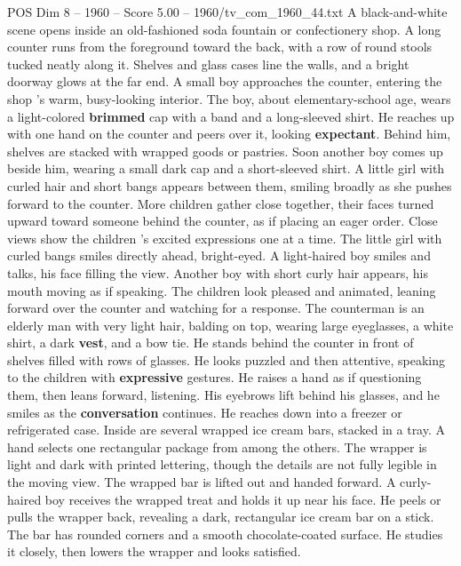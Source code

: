 \begin{textsample}{POS Dim 8 – 1960 – Score 5.00 – 1960/tv\_com\_1960\_44.txt}  \label{ex:f8_pos_087}
A black-and-white scene opens inside an old-fashioned soda fountain or confectionery shop.
A long counter runs from the foreground toward the back, with a row of round stools tucked neatly along it.
Shelves and glass cases line the walls, and a bright doorway glows at the far end.
A small boy approaches the counter, entering the shop ’s warm, busy-looking interior.
The boy, about elementary-school age, wears a light-colored \textbf{brimmed} cap with a band and a long-sleeved shirt.
He reaches up with one hand on the counter and peers over it, looking \textbf{expectant}.
Behind him, shelves are stacked with wrapped goods or pastries.
Soon another boy comes up beside him, wearing a small dark cap and a short-sleeved shirt.
A little girl with curled hair and short bangs appears between them, smiling broadly as she pushes forward to the counter.
More children gather close together, their faces turned upward toward someone behind the counter, as if placing an eager order.
Close views show the children ’s excited expressions one at a time.
The little girl with curled bangs smiles directly ahead, bright-eyed.
A light-haired boy smiles and talks, his face filling the view.
Another boy with short curly hair appears, his mouth moving as if speaking.
The children look pleased and animated, leaning forward over the counter and watching for a response.
The counterman is an elderly man with very light hair, balding on top, wearing large eyeglasses, a white shirt, a dark \textbf{vest}, and a bow tie.
He stands behind the counter in front of shelves filled with rows of glasses.
He looks puzzled and then attentive, speaking to the children with \textbf{expressive} gestures.
He raises a hand as if questioning them, then leans forward, listening.
His eyebrows lift behind his glasses, and he smiles as the \textbf{conversation} continues.
He reaches down into a freezer or refrigerated case.
Inside are several wrapped ice cream bars, stacked in a tray.
A hand selects one rectangular package from among the others.
The wrapper is light and dark with printed lettering, though the details are not fully legible in the moving view.
The wrapped bar is lifted out and handed forward.
A curly-haired boy receives the wrapped treat and holds it up near his face.
He peels or pulls the wrapper back, revealing a dark, rectangular ice cream bar on a stick.
The bar has rounded corners and a smooth chocolate-coated surface.
He studies it closely, then lowers the wrapper and looks satisfied.

\end{textsample}
